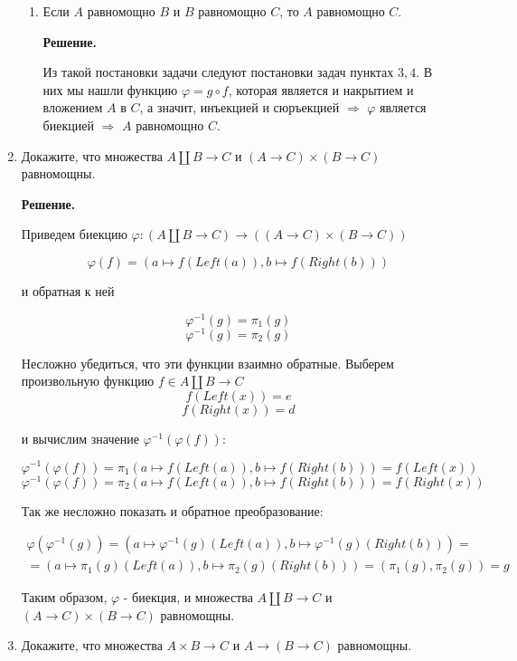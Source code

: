 \begin{enumerate}
\begin{enumerate}
\item Если $A$ равномощно $B$ и $B$ равномощно $C$, то $A$ равномощно $C$.

\textbf{Решение.} 

Из такой постановки задачи следуют постановки задач пунктах $3, 4$. В них мы нашли функцию 
$\varphi = g \circ f$, которая является и накрытием и вложением $A$ в $C$, а значит, инъекцией 
и сюръекцией $\Rightarrow$ $\varphi$ является биекцией $\Rightarrow$ $A$ равномощно $C$.

\end{enumerate}

\item Докажите, что множества $A \amalg B \to C$ и $(A \to C) \times (B \to C)$ равномощны.

\textbf{Решение.} 

Приведем биекцию $\varphi : (A \amalg B \to C) \rightarrow ((A \to C) \times (B \to C))$

$$\varphi(f) = (a \mapsto f(Left(a)), b \mapsto f(Right(b)))$$

и обратная к ней

$$\varphi^{-1}(g) = \pi_1(g)$$
$$\varphi^{-1}(g) = \pi_2(g)$$

Несложно убедиться, что эти функции взаимно обратные.
Выберем произвольную функцию $f\in A \amalg B \to C$
$$f(Left(x)) = e$$
$$f(Right(x)) = d$$

и вычислим значение $\varphi^{-1}(\varphi(f))$:

$$\varphi^{-1}(\varphi(f)) = \pi_1(a \mapsto f(Left(a)), b \mapsto f(Right(b))) = f(Left(x))$$
$$\varphi^{-1}(\varphi(f)) = \pi_2(a \mapsto f(Left(a)), b \mapsto f(Right(b))) = f(Right(x))$$

Так же несложно показать и обратное преобразование:

\begin{equation*}
\begin{array} {lcl}
	\varphi(\varphi^{-1}(g)) = (a \mapsto \varphi^{-1}(g)(Left(a)), b \mapsto \varphi^{-1}(g)(Right(b))) = \\
	= (a \mapsto \pi_1(g)(Left(a)), b \mapsto \pi_2(g)(Right(b))) = (\pi_1(g), \pi_2(g)) = g
\end{array}
\end{equation*}

Таким образом, $\varphi$ - биекция, и множества $A \amalg B \to C$ и $(A \to C) \times (B \to C)$ равномощны.

\item Докажите, что множества $A \times B \to C$ и $A \to (B \to C)$ равномощны.


\end{enumerate}
